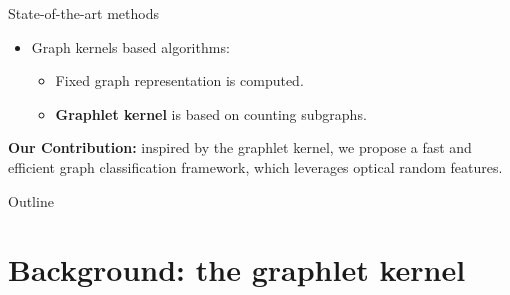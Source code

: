 \documentclass{beamer}
\begin{document}
\begin{frame}{State-of-the-art methods}
    
    \begin{itemize} 
    \item Graph kernels based algorithms:
    \begin{itemize}
    \item Fixed graph representation is computed.
    \item \textbf{Graphlet kernel} is based on counting subgraphs.
    \end{itemize}
\end{itemize}
 \vfill
 \textbf{Our Contribution:} inspired by the graphlet kernel, we propose a fast and efficient graph classification framework, which leverages optical random features.
\end{frame}


\begin{frame}{Outline}
\tiny
\tableofcontents
\end{frame}

\section{Background: the graphlet kernel}
\end{document}
